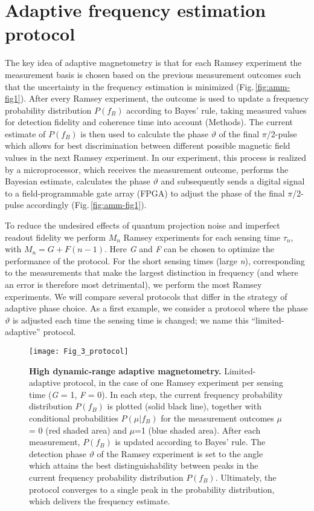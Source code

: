 \section{Adaptive frequency estimation protocol}
The key idea of adaptive magnetometry is that for each Ramsey experiment the measurement basis is chosen based on the previous measurement outcomes such that the uncertainty in the frequency estimation is minimized (Fig.\,\ref{fig:amm-fig1}). After every Ramsey experiment, the outcome is used to update a frequency probability distribution $P(f_B)$ according to Bayes’ rule, taking measured values for detection fidelity and coherence time into account (Methods). The current estimate of $P(f_B)$ is then used to calculate the phase $\vartheta$ of the final $\pi$/2-pulse which allows for best discrimination between different possible magnetic field values in the next Ramsey experiment\cite{Cappellaro_Phys.Rev.A_2012}. In our experiment, this process is realized by a microprocessor, which receives the measurement outcome, performs the Bayesian estimate, calculates the  phase $\vartheta$ and subsequently sends a digital signal to a field-programmable gate array (FPGA) to adjust the phase of the final $\pi$/2-pulse accordingly (Fig.\,\ref{fig:amm-fig1}).

To reduce the undesired effects of quantum projection noise and imperfect readout fidelity we perform $M_n$ Ramsey experiments\cite{Said_Phys.Rev.B_2011} for each sensing time $\tau_n$, with  $M_n = G + F (n-1)$. Here \textit{G} and \textit{F} can be chosen to optimize the performance of the protocol. For the short sensing times (large \textit{n}), corresponding to the measurements that make the largest distinction in frequency (and where an error is therefore most detrimental), we  perform the most Ramsey experiments. We will compare several protocols that differ in the strategy of adaptive phase choice. As a first example, we consider a protocol where the phase $\vartheta$ is adjusted each time the sensing time is changed; we name this “limited-adaptive” protocol. 

\begin{figure*}
	\centering
	\texttt{[image: Fig\_3\_protocol]}
	\caption{\label{fig:amm-fig3} \textbf{High dynamic-range adaptive magnetometry.} Limited-adaptive protocol, in the case of one Ramsey experiment per sensing time (\textit{G} = 1, \textit{F} = 0). In each step, the current frequency probability distribution $P(f_B)$ is plotted (solid black line), together with conditional probabilities $P(\mu|f_B)$ for the measurement outcomes $\mu$ = 0 (red shaded area) and $\mu$=1 (blue shaded area). After each measurement,  $P(f_B)$ is updated according to Bayes’ rule. The detection phase $\vartheta$ of the Ramsey experiment is set to the angle which attains the best distinguishability between peaks in the current frequency probability distribution $P(f_B)$. Ultimately, the protocol converges to a single peak in the probability distribution, which delivers the frequency estimate.}
\end{figure*}

